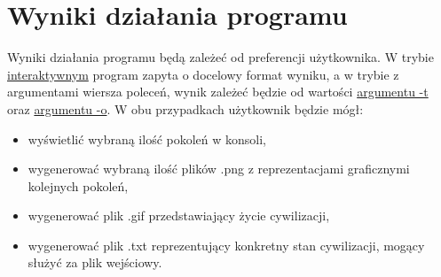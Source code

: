 \documentclass{report}
\begin{document}
\chapter{Wyniki działania programu}
Wyniki działania programu będą zależeć od preferencji użytkownika. W trybie \hyperref[interaktywny]{\textcolor{LinkColor}{interaktywnym}} program zapyta o docelowy format wyniku, a w trybie z argumentami wiersza poleceń, wynik zależeć będzie od wartości  \hyperref[output_args]{\textcolor{LinkColor}{argumentu -t}} oraz \hyperref[output_dest]{\textcolor{LinkColor}{argumentu -o}}. W obu przypadkach użytkownik będzie mógł:
\begin{itemize}
\item wyświetlić wybraną ilość pokoleń w konsoli,
\item wygenerować wybraną ilość plików .png z reprezentacjami graficznymi kolejnych pokoleń,
\item wygenerować plik .gif przedstawiający życie cywilizacji,
\item wygenerować plik .txt reprezentujący konkretny stan cywilizacji, mogący służyć za plik wejściowy.
\end{itemize}
\end{document}
